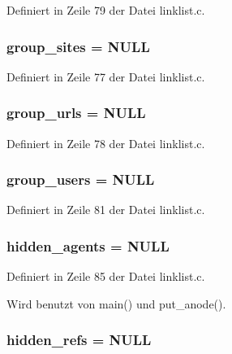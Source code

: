 Definiert in Zeile 79 der Datei linklist.c.
\subsubsection{ {\bf group\_\-sites} = NULL}\label{linklist_8c_cda3597076ed2d11c457ee98bb89caa7}




Definiert in Zeile 77 der Datei linklist.c.
\subsubsection{ {\bf group\_\-urls} = NULL}\label{linklist_8c_2b91bf4fd34380ee9673b57513dbff01}




Definiert in Zeile 78 der Datei linklist.c.
\subsubsection{ {\bf group\_\-users} = NULL}\label{linklist_8c_5589f953a1673e7a2f3891d321794340}




Definiert in Zeile 81 der Datei linklist.c.
\subsubsection{ {\bf hidden\_\-agents} = NULL}\label{linklist_8c_89feb23799329906fbd4a3d47a303027}




Definiert in Zeile 85 der Datei linklist.c.

Wird benutzt von main() und put\_\-anode().
\subsubsection{ {\bf hidden\_\-refs} = NULL}\label{linklist_8c_7f8ec975eaff8227a3e09efb17d3e064}




